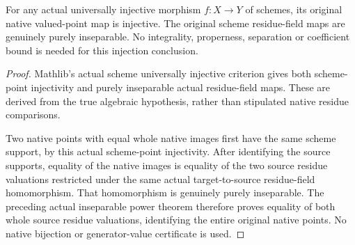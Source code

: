 \begin{theorem}
\label{scheme:universally-injective-native-map}
\leanok
{}
For any actual universally injective morphism $f:X\to Y$ of schemes,
its original native valued-point map is injective. The original
scheme residue-field maps are genuinely purely inseparable. No
integrality, properness, separation or coefficient bound is needed
for this injection conclusion.
\end{theorem}
\begin{proof}
Mathlib's actual scheme universally injective criterion gives both
scheme-point injectivity and purely inseparable actual residue-field
maps. These are derived from the true algebraic hypothesis, rather
than stipulated native residue comparisons.

Two native points with equal whole native images first have the same
scheme support, by this actual scheme-point injectivity. After
identifying the source supports, equality of the native images is
equality of the two source residue valuations restricted under the
same actual target-to-source residue-field homomorphism. That
homomorphism is genuinely purely inseparable. The preceding actual
inseparable power theorem therefore proves equality of both whole
source residue valuations, identifying the entire original native
points. No native bijection or generator-value certificate is used.
\end{proof}

